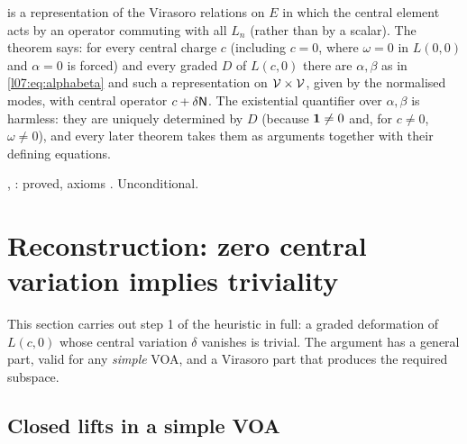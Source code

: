 \begin{dictionary}
 is a representation of the Virasoro relations on $E$ in which the central
element acts by an operator  commuting with all $L_n$ (rather than by a scalar). The
theorem says: for every central charge $c$ (including $c = 0$, where $\omega = 0$ in $L(0,0)$ and
$\alpha = 0$ is forced) and every graded $D$ of $L(c,0)$ there are $\alpha,\beta$ as in \eqref{l07:eq:alphabeta}
and such a representation on $\mathcal{V}\times\mathcal{V}$, given by the normalised modes, with central operator
$c+\delta\mathsf{N}$. The existential quantifier over $\alpha,\beta$ is harmless: they are uniquely determined
by $D$ (because $\mathbf{1}\ne0$ and, for $c\neq0$, $\omega\neq0$), and every later theorem takes them as
arguments together with their defining equations.
\end{dictionary}

\begin{status}
, : proved, axioms
. Unconditional.
\end{status}

\section{Reconstruction: zero central variation implies triviality}\label{l07:sec:reconstruction}

This section carries out step 1 of the heuristic in full: a graded deformation of $L(c,0)$ whose
central variation $\delta$ vanishes is trivial. The argument has a general part, valid for any
\emph{simple} VOA, and a Virasoro part that produces the required subspace.

\subsection{Closed lifts in a simple VOA}

